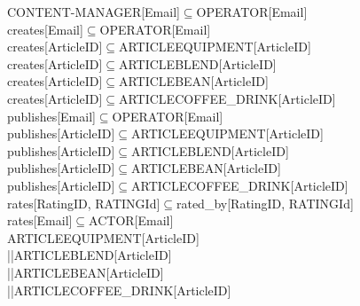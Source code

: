 CONTENT-MANAGER[Email]$\subseteq$OPERATOR[Email]\\
creates[Email]$\subseteq$OPERATOR[Email]\\
creates[ArticleID]$\subseteq$ARTICLEEQUIPMENT[ArticleID]\\
creates[ArticleID]$\subseteq$ARTICLEBLEND[ArticleID]\\
creates[ArticleID]$\subseteq$ARTICLEBEAN[ArticleID]\\
creates[ArticleID]$\subseteq$ARTICLECOFFEE\_DRINK[ArticleID]\\
publishes[Email]$\subseteq$OPERATOR[Email]\\
publishes[ArticleID]$\subseteq$ARTICLEEQUIPMENT[ArticleID]\\
publishes[ArticleID]$\subseteq$ARTICLEBLEND[ArticleID]\\
publishes[ArticleID]$\subseteq$ARTICLEBEAN[ArticleID]\\
publishes[ArticleID]$\subseteq$ARTICLECOFFEE\_DRINK[ArticleID]\\
rates[RatingID,  RATINGId]$\subseteq$rated\_by[RatingID,  RATINGId]\\
rates[Email]$\subseteq$ACTOR[Email]\\
ARTICLEEQUIPMENT[ArticleID]\\||ARTICLEBLEND[ArticleID]\\||ARTICLEBEAN[ArticleID]\\||ARTICLECOFFEE\_DRINK[ArticleID]\\
